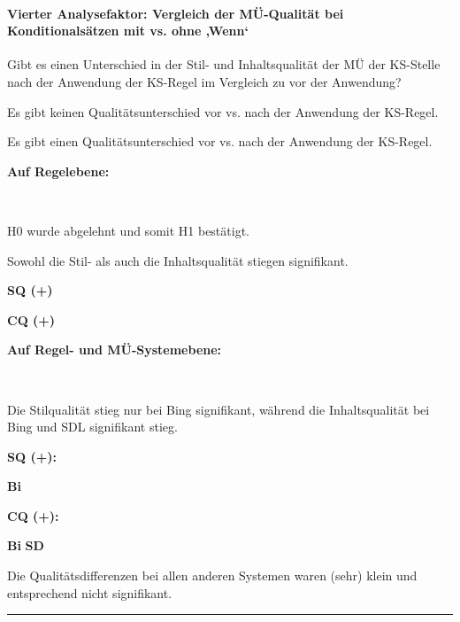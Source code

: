 \paragraph*{Vierter Analysefaktor: Vergleich der MÜ-Qualität bei Konditionalsätzen mit vs. ohne ‚Wenn‘}
\begin{description}[font=\normalfont\bfseries]
\item [Fragestellung:] Gibt es einen Unterschied in der Stil- und Inhaltsqualität der MÜ der KS-Stelle nach der Anwendung der KS-Regel im Vergleich zu vor der Anwendung?
\item [H0 --] Es gibt keinen Qualitätsunterschied vor vs. nach der Anwendung der KS-Regel.
\item [H1 --] Es gibt einen Qualitätsunterschied vor vs. nach der Anwendung der KS-Regel.
\item [Resultat]
\end{description}
\noindent
\parbox[t]{.75\textwidth}{\textbf{Auf Regelebene:}}\\
\noindent
\parbox[t]{.75\textwidth}{
H0 wurde abgelehnt und somit H1 bestätigt.

Sowohl die Stil- als auch die Inhaltsqualität stiegen signifikant.}
\parbox[t]{.04\textwidth}{}
\colorbox{smGreen}{\parbox[t]{.2\textwidth}{
{ \textbf{SQ (+)}}

\textbf{CQ (+)}\\
}}

\noindent
\parbox[t]{.75\textwidth}{\textbf{Auf Regel- und MÜ-Systemebene:}}\\
\noindent
\parbox[t]{.75\textwidth}{
Die Stilqualität stieg nur bei Bing signifikant, während die Inhaltsqualität bei Bing und SDL signifikant stieg.
}
\parbox[t]{.04\textwidth}{}
\colorbox{smGreen}{\parbox[t]{.09\textwidth}{
{ \textbf{SQ (+):}}

 \textbf{Bi}
}}
\colorbox{smGreen}{\parbox[t]{.09\textwidth}{
{ \textbf{CQ (+):}}

{ \textbf{Bi}} \textbf{SD}
}}

\medskip
\noindent
\parbox[t]{.75\textwidth}{Die Qualitätsdifferenzen bei allen anderen Systemen waren (sehr) klein und entsprechend nicht signifikant.}
\hrule
